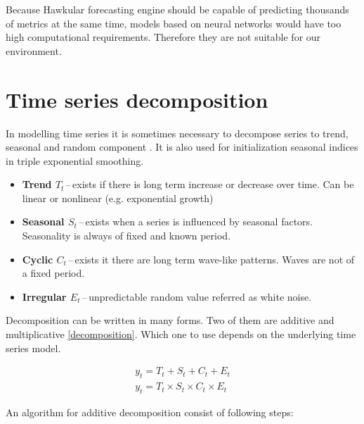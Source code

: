     Because Hawkular forecasting engine should be capable of predicting thousands of metrics at the same time, models
    based on neural networks would have too high computational requirements. Therefore they are not suitable for our
    environment.

    \section{Time series decomposition}
    In modelling time series it is sometimes necessary to decompose series to trend, seasonal and random component
    \cite{otexts}. It is also used for initialization seasonal indices in triple exponential smoothing.

    \begin{itemize}
        \item \textbf{Trend $ T_{t} $}\,--\,exists if there is long term increase or decrease over
            time. Can be linear or nonlinear (e.g. exponential growth)
        \item \textbf{Seasonal $ S_{t} $}\,--\,exists when a series is influenced by seasonal factors.
            Seasonality is always of fixed and known period.
        \item \textbf{Cyclic $ C_{t} $}\,--\,exists it there are long term wave-like patterns.
            Waves are not of a fixed period.
        \item \textbf{Irregular $ E_{t} $}\,--\,unpredictable random value referred as white
            noise. 
    \end{itemize}

    Decomposition can be written in many forms. Two of them are additive and multiplicative \ref{decomposition}.
    Which one to use depends on the underlying time series model.

    \begin{eqnarray} \label{decomposition}
        y_{t} = T_{t} + S_{t} + C_{t} + E_{t} \\
        y_{t} = T_{t} \times S_{t} \times C_{t} \times E_{t}
    \end{eqnarray}

    An algorithm for additive decomposition consist of following steps:

